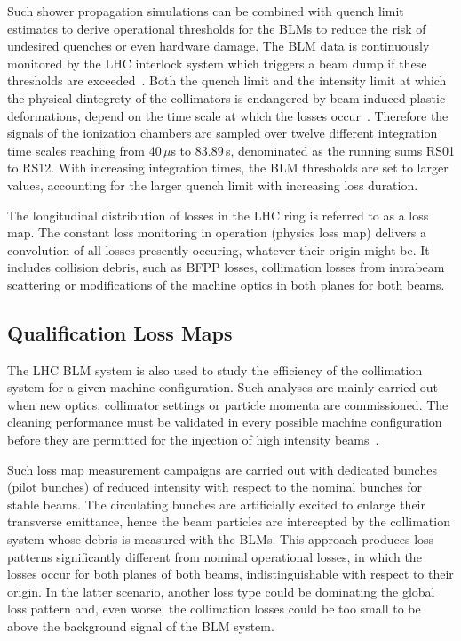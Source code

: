 Such shower propagation simulations can be combined with quench limit estimates to derive operational thresholds for the BLMs to reduce the risk of undesired quenches or even hardware damage. The BLM data is continuously monitored by the LHC interlock system which triggers a beam dump if these thresholds are exceeded~\cite{guaglio2005reliability}. Both the quench limit and the intensity limit at which the physical dintegrety of the collimators is endangered by beam induced plastic deformations, depend on the time scale at which the losses occur~\cite{bertarelli:chamonix11}. Therefore the signals of the ionization chambers are sampled over twelve different integration time scales reaching from 40\,$\mu$s to $83.89\,$s, denominated as the running sums RS01 to RS12. With increasing integration times, the BLM thresholds are set to larger values, accounting for the larger quench limit with increasing loss duration. 

The longitudinal distribution of losses in the LHC ring is referred to as a loss map. The constant loss monitoring in operation (physics loss map) delivers a convolution of all losses presently occuring, whatever their origin might be. It includes collision debris, such as BFPP losses, collimation losses from intrabeam scattering or modifications of the machine optics in both planes for both beams. 
%
\subsection{Qualification Loss Maps}\label{chap:qualification_lossmaps}

The LHC BLM system is also used to study the efficiency of the collimation system for a given machine configuration. Such analyses are mainly carried out when new optics, collimator settings or particle momenta are commissioned. The cleaning performance must be validated in every possible machine configuration before they are permitted for the injection of high intensity beams~\cite{}. 

Such loss map measurement campaigns are carried out with dedicated bunches (pilot bunches) of reduced intensity with respect to the nominal bunches for stable beams. The circulating bunches are artificially excited to enlarge their transverse emittance, hence the beam particles are intercepted by the collimation system whose debris is measured with the BLMs. This approach produces loss patterns significantly different from nominal operational losses, in which the losses occur for both planes of both beams, indistinguishable with respect to their origin. In the latter scenario, another loss type could be dominating the global loss pattern and, even worse, the collimation losses could be too small to be above the background signal of the BLM system. 

